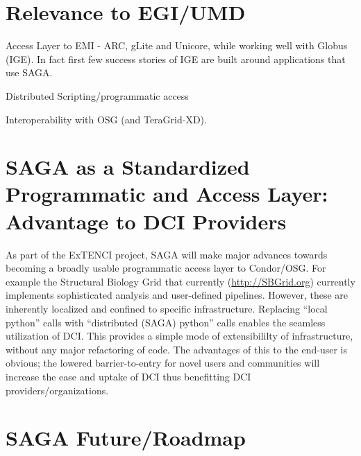 \documentclass[12pt]{article}
\begin{document}
   
\section{Relevance to EGI/UMD}

Access Layer to EMI - ARC, gLite and Unicore, while working well with
Globus (IGE). In fact first few success stories of IGE are built
around applications that use SAGA.

Distributed Scripting/programmatic access

Interoperability with OSG (and TeraGrid-XD).

\section{SAGA as a Standardized Programmatic and Access Layer:
  Advantage to DCI Providers}

As part of the ExTENCI project, SAGA will make major advances towards
becoming a broadly usable programmatic access layer to Condor/OSG.
For example the Structural Biology Grid that currently
(\url{http://SBGrid.org}) currently implements sophisticated analysis
and user-defined pipelines. However, these are inherently localized
and confined to specific infrastructure.  Replacing ``local python''
calls with ``distributed (SAGA) python'' calls enables the seamless
utilization of DCI. This provides a simple mode of extensibililty of
infrastructure, without any major refactoring of code. The advantages
of this to the end-user is obvious; the lowered barrier-to-entry for
novel users and communities will increase the ease and uptake of DCI
thus benefitting DCI providers/organizations.

\section{SAGA Future/Roadmap}



\end{document}
